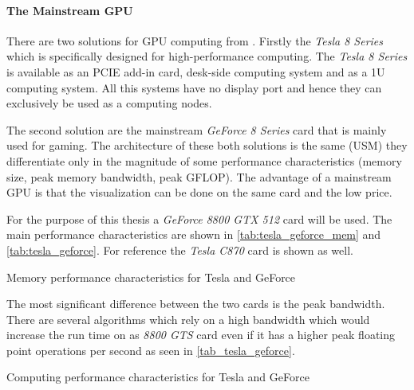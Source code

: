 \paragraph{The Mainstream GPU} %
\label{par:the_mainstream_gpu}
There are two solutions for \gls{GPU} computing from {}. Firstly the
\emph{Tesla 8 Series} which is specifically designed for high-performance
computing. The \emph{Tesla 8 Series} is available as an \gls{PCIE} add-in card,
desk-side computing system and as a \gls{1U} computing system. All this systems have
no display port and hence they can exclusively be used as a computing nodes. 

The second solution are the mainstream \emph{GeForce 8 Series} card that
is mainly used for gaming. The architecture of these both solutions is the same
(\gls{USM}) they differentiate only in the magnitude of some performance
characteristics (memory size, peak memory bandwidth, peak \gls{GFLOP}). The
advantage of a mainstream \gls{GPU} is that the visualization can be done on the
same card and the low price. 

For the purpose of this thesis a \emph{GeForce 8800 GTX 512} card will be
used. The main performance characteristics are shown in
\autoref{tab:tesla_geforce_mem} and \autoref{tab:tesla_geforce}. For reference
the \emph{Tesla C870} card is shown as well.

\begin{table}[ht]
	\centering
  	\caption{Memory performance characteristics for Tesla and GeForce}
  	\label{tab:tesla_geforce_mem}
\end{table}

The most significant difference between the two cards is the peak bandwidth. There
are several algorithms which rely on a high bandwidth which would increase the
run time on as \emph{8800 GTS} card even if it has a higher peak floating
point operations per second as seen in  \autoref{tab_tesla_geforce}. 

\begin{table}[ht]
	\centering
  	\caption{Computing performance characteristics for Tesla and GeForce}
  	\label{tab:tesla_geforce}
\end{table}


